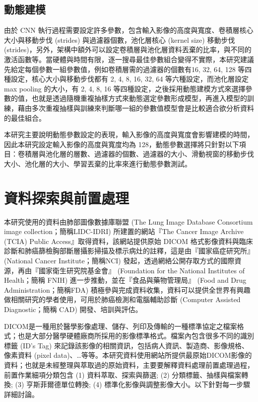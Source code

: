 \documentclass[12pt, a4paper]{article} 				%
\begin{document}
\subsection{動態建模}
由於 CNN 執行過程需要設定許多參數，包含輸入影像的高度與寬度、卷積層核心大小與移動步伐 (strides) 與過濾器個數，池化層核心 (kernel size) 移動步伐 (strides)，另外，架構中額外可以設定卷積層與池化層資料丟棄的比率，與不同的激活函數等。當硬體與時間有限，逐一搜尋最佳參數組合變得不實際，本研究建議先給定每個參數一組參數值，例如卷積層需的過濾器的個數有16, 32, 64, 128 等四種設定，核心大小與移動步伐都有 2, 4, 8, 16, 32, 64 等六種設定，而池化層設定 max pooling 的大小，有 2, 4, 8, 16 等四種設定，之後採用動態建模方式來選擇參數的值，也就是透過隨機重複抽樣方式來動態選定參數形成模型，再進入模型的訓練，藉由多次重複抽樣與訓練來判斷哪一組的參數值模型會是比較適合欲分析資料的最佳組合。

本研究主要說明動態參數設定的表現，輸入影像的高度與寬度會影響建模的時間，因此本研究設定輸入影像的高度與寬度均為 128，動態參數選擇將只針對以下項目：卷積層與池化層的層數、過濾器的個數、過濾器的大小、滑動視窗的移動步伐大小、池化層的大小、學習丟棄的比率來進行動態參數測試。

\section{資料探索與前置處理}
本研究使用的資料由肺部圖像數據庫聯盟 (The Lung Image Database Consortium image collection；簡稱LIDC-IDRI) 所建置的網站『The Cancer Image Archive (TCIA) Public Access』取得資料，該網站提供原始 DICOM 格式影像資料與臨床診斷和肺癌篩檢胸部斷層攝影掃描及標示病灶的註釋，這是由『國家癌症研究所』 (National Cancer Institute；簡稱NCI) 發起，透過網絡公開存取方式的國際資源，再由『國家衛生研究院基金會』 (Foundation for the National Institutes of Health；簡稱 FNIH) 進一步推動，並在『食品與藥物管理局』 (Food and Drug Administration；簡稱FDA) 積極參與完成資料收集，資料可以提供全世界有興趣做相關研究的學者使用，可用於肺癌檢測和電腦輔助診斷 (Computer Assisted Diagnostic；簡稱 CAD) 開發、培訓與評估。

DICOM是一種用於醫學影像處理、儲存、列印及傳輸的一種標準協定之檔案格式；也是大部分醫學硬體廠商所採用的影像標準格式。檔案內包含很多不同的識別標籤 (ID's Tag) 來記錄該影像的相關資訊，包括病人資訊、製造商、影像規格、像素資料 (pixel data)、…等等。本研究資料使用網站所提供最原始DICOM影像的資料；也就是未經整理與萃取過的原始資料，主要要解釋資料處理前置處理過程，前置作業細項分類包含 (1)	資料萃取、探索與篩選; (2)	分類標籤、抽樣與檔案轉換; (3)	 亨斯菲爾德單位轉換; (4) 標準化影像與調整影像大小。以下針對每一步驟詳細討論。
\end{document}
